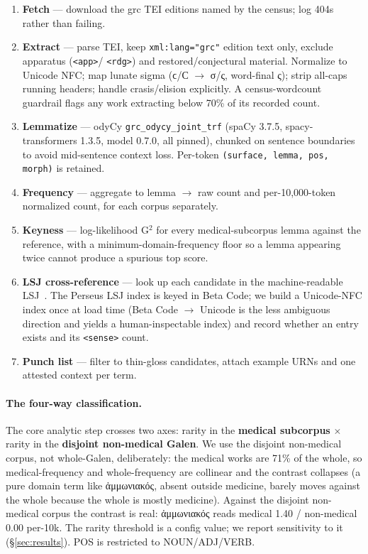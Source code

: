 \documentclass[11pt]{article}
\begin{document}
\begin{enumerate}[leftmargin=*,itemsep=3pt]
\item \textbf{Fetch} --- download the grc TEI editions named by the census; log 404s rather than failing.
\item \textbf{Extract} --- parse TEI, keep \texttt{xml:lang="grc"} edition text only, exclude apparatus (\texttt{<app>}/
  \texttt{<rdg>}) and restored/conjectural material. Normalize to Unicode NFC; map lunate sigma
  (ϲ/Ϲ $\rightarrow$ σ/ς, word-final ς); strip all-caps running headers; handle crasis/elision explicitly.
  A census-wordcount guardrail flags any work extracting below 70\% of its recorded count.
\item \textbf{Lemmatize} --- odyCy \texttt{grc\_odycy\_joint\_trf} (spaCy 3.7.5, spacy-transformers 1.3.5, model
  0.7.0, all pinned), chunked on sentence boundaries to avoid mid-sentence context loss.
  Per-token \texttt{(surface, lemma, pos, morph)} is retained.
\item \textbf{Frequency} --- aggregate to lemma $\rightarrow$ raw count and per-10{,}000-token normalized count, for each
  corpus separately.
\item \textbf{Keyness} --- log-likelihood G$^2$ for every medical-subcorpus lemma against the reference, with a
  minimum-domain-frequency floor so a lemma appearing twice cannot produce a spurious top score.
\item \textbf{LSJ cross-reference} --- look up each candidate in the machine-readable LSJ~\citep{lsj-perseus}. The
  Perseus LSJ index is keyed in Beta Code; we build a Unicode-NFC index once at load time (Beta
  Code $\rightarrow$ Unicode is the less ambiguous direction and yields a human-inspectable index) and record
  whether an entry exists and its \texttt{<sense>} count.
\item \textbf{Punch list} --- filter to thin-gloss candidates, attach example URNs and one attested context
  per term.
\end{enumerate}

\paragraph{The four-way classification.}
The core analytic step crosses two axes: rarity in the \textbf{medical
subcorpus} $\times$ rarity in the \textbf{disjoint non-medical Galen}. We use the disjoint non-medical corpus,
not whole-Galen, deliberately: the medical works are 71\% of the whole, so medical-frequency and
whole-frequency are collinear and the contrast collapses (a pure domain term like ἀμμωνιακός, absent
outside medicine, barely moves against the whole because the whole is mostly medicine). Against the
disjoint non-medical corpus the contrast is real: ἀμμωνιακός reads medical 1.40 / non-medical 0.00
per-10k. The rarity threshold is a config value; we report sensitivity to it (\S\ref{sec:results}). POS is restricted
to NOUN/ADJ/VERB.
\end{document}
